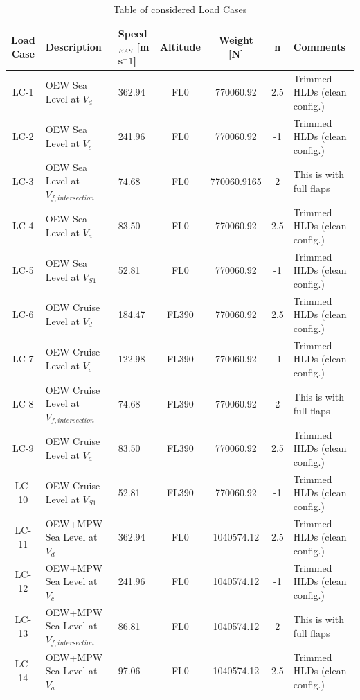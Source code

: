 \begin{longtable}{|>{\columncolor{blue!15}}c|p{3.2cm}|p{2cm}|c|c|c|p{2.6cm}|}
\caption{Table of considered Load Cases}
\label{tab:LoadCases}
\endfirsthead
    \hline
    \rowcolor{blue!15} \textbf{Load Case} & \textbf{Description} & \textbf{Speed$_{EAS}$ [m s$^-1$]} & \textbf{Altitude} & \textbf{Weight [N]} & \textbf{n} & \textbf{Comments} \\
    \hline
    LC-1 & OEW Sea Level at $V_{d}$ & 362.94 & FL0 & 770060.92 & 2.5 & Trimmed HLDs (clean config.) \\
    \hline
    LC-2 & OEW Sea Level at $V_{c}$ & 241.96 & FL0 & 770060.92 & -1 & Trimmed HLDs (clean config.) \\ 
    \hline
    LC-3 & OEW Sea Level at $V_{f,intersection}$ & 74.68 & FL0 & 770060.9165 & 2 & This is with full flaps \\ \hline
    LC-4 & OEW Sea Level at $V_{a}$ & 83.50 & FL0 & 770060.92 & 2.5 & Trimmed HLDs (clean config.) \\ 
    \hline
    LC-5 & OEW Sea Level at $V_{S1}$ & 52.81 & FL0 & 770060.92 & -1 & Trimmed HLDs (clean config.) \\ 
    \hline
    LC-6 & OEW Cruise Level at $V_{d}$ & 184.47 & FL390 & 770060.92 & 2.5 & Trimmed HLDs (clean config.) \\ 
    \hline
    LC-7 & OEW Cruise Level at $V_{c}$ & 122.98 & FL390 & 770060.92 & -1 & Trimmed HLDs (clean config.) \\ 
    \hline
    LC-8 & OEW Cruise Level at $V_{f,intersection}$ & 74.68 & FL390 & 770060.92 & 2 & This is with full flaps \\ 
    \hline
    LC-9 & OEW Cruise Level at $V_{a}$ & 83.50 & FL390 & 770060.92 & 2.5 & Trimmed HLDs (clean config.) \\ 
    \hline
    LC-10 & OEW Cruise Level at $V_{S1}$ & 52.81 & FL390 & 770060.92 & -1 & Trimmed HLDs (clean config.) \\ 
    \hline
    LC-11 & OEW+MPW Sea Level at $V_{d}$ & 362.94 & FL0 & 1040574.12 & 2.5 & Trimmed HLDs (clean config.) \\ 
    \hline
    LC-12 & OEW+MPW Sea Level at $V_{c}$ & 241.96 & FL0 & 1040574.12& -1 & Trimmed HLDs (clean config.) \\ 
    \hline
    LC-13 & OEW+MPW Sea Level at $V_{f,intersection}$ & 86.81 & FL0 & 1040574.12 & 2 & This is with full flaps \\ 
    \hline
    LC-14 & OEW+MPW Sea Level at $V_{a}$ & 97.06 & FL0 & 1040574.12 & 2.5 & Trimmed HLDs (clean config.) \\

\end{longtable}
